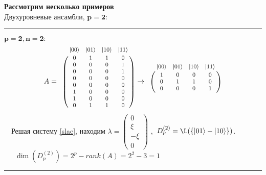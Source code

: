 \clearpage
\noindent \textbf{Рассмотрим несколько примеров}\\[12pt]Двухуровневые ансамбли, $\mathbf{p = 2}$:\\
\medskip\hrule\medskip
\noindent$\mathbf{p = 2, n = 2:}$
\begin{equation}\label{eq:matrix2}
	{\footnotesize
		A =
		\bordermatrix{
			& |00\rangle & |01\rangle & |10\rangle & |11\rangle \cr
			& 0 & 1 & 1 & 0 \cr
			& 0 & 0 & 0 & 1 \cr
			& 0 & 0 & 0 & 1 \cr
			& 0 & 0 & 0 & 0 \cr
			& 0 & 0 & 0 & 0 \cr
			& 1 & 0 & 0 & 0 \cr
			& 1 & 0 & 0 & 0 \cr
			& 0 & 1 & 1 & 0 \cr
		}\rightarrow
		\bordermatrix{
			& |00\rangle & |01\rangle & |10\rangle & |11\rangle \cr
			& 1 & 0 & 0 & 0 \cr
			& 0 & 1 & 1 & 0 \cr
			& 0 & 0 & 0 & 1 \cr
		}
	}
\end{equation}
\quad\quad~~Решая систему \eqref{slae}, находим
{\footnotesize
	$\lambda =
	\begin{pmatrix}
		0\\
		\xi\\
		-\xi\\
		0
	\end{pmatrix}
	$
},\
\quad$D^{(2)}_p = \L(\{|01\rangle - |10\rangle\})$.\\[12pt]

\noindent\quad\quad~~~$\dim(D^{(2)}_p) = 2^{p} - rank(A) = 2^{2} - 3 = 1$\\

\medskip\hrule\medskip

